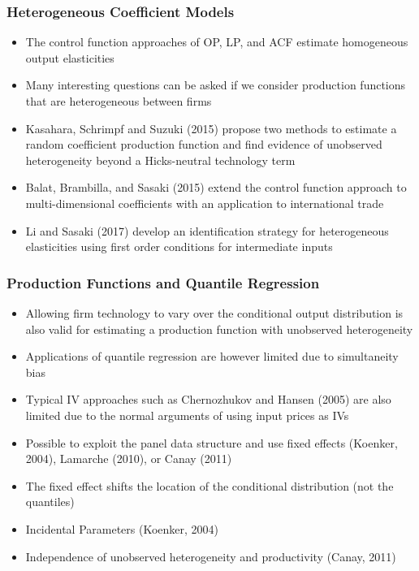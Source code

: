 \documentclass{beamer}
\begin{document}

\begin{frame}
\frametitle{Heterogeneous Coefficient Models}
\begin{itemize}
	\item The control function approaches of OP, LP, and ACF estimate homogeneous output elasticities
	\item Many interesting questions can be asked if we consider production functions that are heterogeneous between firms
	\item Kasahara, Schrimpf and Suzuki (2015) propose two methods to estimate a random coefficient production function and find evidence of unobserved heterogeneity beyond a Hicks-neutral technology term
	\item Balat, Brambilla, and Sasaki (2015) extend the control function approach to multi-dimensional coefficients with an application to international trade
	\item Li and Sasaki (2017) develop an identification strategy for heterogeneous elasticities using first order conditions for intermediate inputs
\end{itemize}
\end{frame}

\begin{frame}
\frametitle{Production Functions and Quantile Regression}
\begin{itemize}
	\item Allowing firm technology to vary over the conditional output distribution is also valid for estimating a production function with unobserved heterogeneity
	\item Applications of quantile regression are however limited due to simultaneity bias
	\item Typical IV approaches such as Chernozhukov and Hansen (2005) are also limited due to the normal arguments of using input prices as IVs
	\item Possible to exploit the panel data structure and use fixed effects (Koenker, 2004), Lamarche (2010), or Canay (2011)
	\item The fixed effect shifts the location of the conditional distribution (not the quantiles)
	\item Incidental Parameters (Koenker, 2004)
	\item Independence of unobserved heterogeneity and productivity (Canay, 2011)
	
\end{itemize}
\end{frame}
\end{document}
